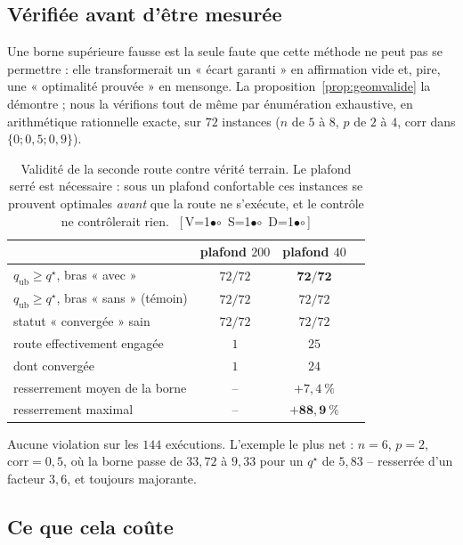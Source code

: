 \documentclass[11pt,a4paper]{article}
\theoremstyle{plain}
\theoremstyle{remark}
\newcommand{\qs}{q^{\star}}
\newcommand{\cfgm}[1]{\ifnum#1=1$\bullet$\else$\circ$\fi}
\newcommand{\conf}[3]{%
  \textsf{\footnotesize[\,V\cfgm{#1}\ S\cfgm{#2}\ D\cfgm{#3}\,]}}
\begin{document}
\subsection{Vérifiée avant d'être mesurée}

Une borne supérieure fausse est la seule faute que cette méthode ne peut pas
se permettre : elle transformerait un « écart garanti » en affirmation vide
et, pire, une « optimalité prouvée » en mensonge. La
proposition~\ref{prop:geomvalide} la démontre ; nous la vérifions tout de
même par énumération exhaustive, en arithmétique rationnelle exacte, sur
$72$ instances ($n$ de $5$ à $8$, $p$ de $2$ à $4$, $\text{corr}$ dans
$\{0;0{,}5;0{,}9\}$).

\begin{table}[H]
\centering
\caption{Validité de la seconde route contre vérité terrain. Le plafond
serré est nécessaire : sous un plafond confortable ces instances se prouvent
optimales \emph{avant} que la route ne s'exécute, et le contrôle ne
contrôlerait rien.\ \conf{1}{1}{1}}
\label{tab:geomvalide}
\begin{tabular}{lccc}
\toprule
& plafond $200$ & plafond $40$\\
\midrule
$q_{\text{ub}}\ge\qs$, bras « avec »    & $72/72$ & $\mathbf{72/72}$\\
$q_{\text{ub}}\ge\qs$, bras « sans » (témoin) & $72/72$ & $72/72$\\
statut « convergée » sain               & $72/72$ & $72/72$\\
\midrule
route effectivement engagée             & $1$     & $25$\\
dont convergée                          & $1$     & $24$\\
resserrement moyen de la borne          & --      & $+7{,}4\ \%$\\
resserrement maximal                    & --      & $\mathbf{+88{,}9\ \%}$\\
\bottomrule
\end{tabular}
\end{table}

\noindent
Aucune violation sur les $144$ exécutions. L'exemple le plus net :
$n=6$, $p=2$, $\text{corr}=0{,}5$, où la borne passe de $33{,}72$ à
$9{,}33$ pour un $\qs$ de $5{,}83$ -- resserrée d'un facteur $3{,}6$, et
toujours majorante.

\subsection{Ce que cela coûte}
\end{document}
